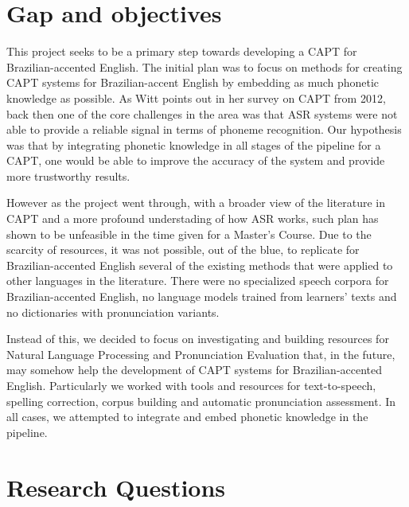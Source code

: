 \section*{Gap and objectives} 

This project seeks to be a primary step towards developing a \ac{CAPT} for Brazilian-accented English. The initial plan was to focus on methods for creating \ac{CAPT} systems for Brazilian-accent English by embedding as much phonetic knowledge as possible. As Witt \citep{Witt2012} points out in her survey on \ac{CAPT} from 2012, back then one of the core challenges in the area was that \ac{ASR} systems were not able to provide a reliable signal in terms of phoneme recognition. Our hypothesis was that by integrating phonetic knowledge in all stages of the pipeline for a \ac{CAPT}, one would be able to improve the accuracy of the system and provide more trustworthy results.

However as the project went through, with a broader view of the literature in \ac{CAPT} and a more profound understading of how \ac{ASR} works, such plan has shown to be unfeasible in the time given for a Master's Course. Due to the scarcity of resources, it was not possible, out of the blue, to replicate for Brazilian-accented English several of the existing methods that were applied to other languages in the literature. There were no specialized speech corpora for Brazilian-accented English, no language models trained from learners' texts and no dictionaries with pronunciation variants.

Instead of this, we decided to focus on investigating and building resources for Natural Language Processing and Pronunciation Evaluation that, in the future, may somehow help the development of \ac{CAPT} systems for Brazilian-accented English. Particularly we worked with tools and resources for text-to-speech, spelling correction, corpus building and automatic pronunciation assessment. In all cases, we attempted to integrate and embed phonetic knowledge in the pipeline.

\section*{Research Questions}

